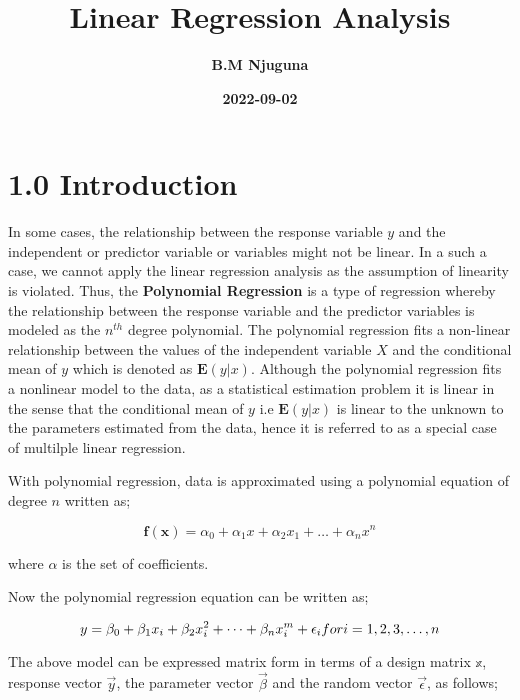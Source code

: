 \documentclass[
]{article}
\title{\textbf{Linear Regression Analysis}}
\author{\textbf{B.M Njuguna}}
\date{\textbf{2022-09-02}}
\begin{document}
\maketitle

\newpage
\tableofcontents
\newpage

\hypertarget{introduction}{%
\section{1.0 Introduction}\label{introduction}}

In some cases, the relationship between the response variable \(y\) and
the independent or predictor variable or variables might not be linear.
In a such a case, we cannot apply the linear regression analysis as the
assumption of linearity is violated. Thus, the \textbf{Polynomial
Regression} is a type of regression whereby the relationship between the
response variable and the predictor variables is modeled as the
\(n^{th}\) degree polynomial. The polynomial regression fits a
non-linear relationship between the values of the independent variable
\(X\) and the conditional mean of \(y\) which is denoted as
\(\mathbf{E}(y|x)\). Although the polynomial regression fits a nonlinear
model to the data, as a statistical estimation problem it is linear in
the sense that the conditional mean of \(y\) i.e \(\mathbf{E}(y|x)\) is
linear to the unknown to the parameters estimated from the data, hence
it is referred to as a special case of multilple linear regression.

With polynomial regression, data is approximated using a polynomial
equation of degree \(n\) written as;

\[\mathbf{f(x)}=\alpha_0+\alpha_1x+\alpha_2x_1+\dots+\alpha_nx^n\]

where \(\alpha\) is the set of coefficients.

Now the polynomial regression equation can be written as;

\[y=\beta_0+\beta_1x_i+\beta_2x_i^2+\dots+\beta_nx_i^m+\epsilon_i \\for\space i=1,2,3,\dots,n\]

The above model can be expressed matrix form in terms of a design matrix
\(\mathbb{x}\), response vector \(\vec{y}\), the parameter vector
\(\vec{\beta}\) and the random vector \(\vec{\epsilon }\), as follows;
\end{document}
